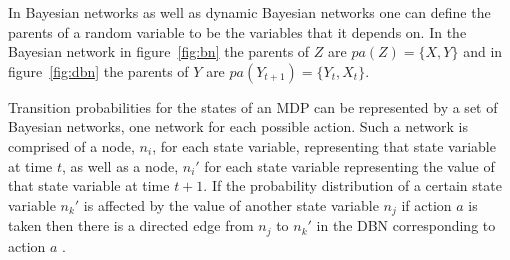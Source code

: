 In Bayesian networks as well as dynamic Bayesian networks one can define the
parents of a random variable to be the variables that it depends on. In the
Bayesian network in figure~\ref{fig:bn} the parents of $Z$ are $pa(Z) = \{X,
Y\}$ and in figure~\ref{fig:dbn} the parents of $Y$ are $pa(Y_{t+1}) = \{Y_t,
X_t\}$.

Transition probabilities for the states of an MDP can be represented by a set
of Bayesian networks, one network for each possible action. Such a network is
comprised of a node, $n_i$, for each state variable, representing that state
variable at time $t$, as well as a node, $n_i'$ for each state variable
representing the value of that state variable at time $t+1$. If the probability
distribution of a certain state variable $n_k'$ is affected by the value of
another state variable $n_j$ if action $a$ is taken then there is a directed
edge from $n_j$ to $n_k'$ in the DBN corresponding to action $a$
\parencite{guestrin2003efficient}.
